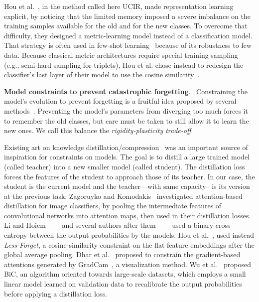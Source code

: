 \documentclass[runningheads]{llncs}
\newcommand{\parag}[1]{\vspace{0.2cm}\noindent\textbf{#1}.\ }
\begin{document}
Hou et al.~\cite{hou2019ucir}, in the method called here UCIR, made representation learning explicit, by noticing that the limited memory imposed a severe imbalance on the training samples available for the old and for the new classes. To overcome that difficulty, they designed a metric-learning model instead of a classification model. That strategy is often used in few-shot learning~\cite{gidaris2018fewshot_wo_forgetting} because of its robustness to few data. Because classical metric architectures require special training sampling (e.g., semi-hard sampling for triplets), Hou et al. chose instead to redesign the classifier's last layer of their model to use the cosine similarity~\cite{luo2018cosine_classifier}.

\parag{Model constraints to prevent catastrophic forgetting} Constraining the model's evolution to prevent forgetting is a fruitful idea proposed by several methods~\cite{kirkpatrick2017ewc,lopezpaz2017gem,aljundi2018MemoryAwareSynapses,li2018lwf,rebuffi2017icarl,castro2018end_to_end_inc_learn}. 
Preventing the model's parameters from diverging too much forces it to remember the old classes, but care must be taken to still allow it to learn the new ones. We call this balance the \textit{rigidity-plasticity trade-off}.

Existing art on knowledge distillation/compression~\cite{hinton2015knowledge_distillation} was an important source of inspiration for constraints on models. The goal is to distill a large trained model (called teacher) into a new smaller model (called student). The distillation loss forces the features of the student to approach those of its teacher. In our case, the student is the current model and the teacher---with same capacity-- is its version at the previous task. Zagoruyko and Komodakis~\cite{komodakis2017attention_residual_distillation} investigated attention-based distillation for image classifiers, by pooling the intermediate features of convolutional networks into attention maps, then used in their distillation losses.
Li and Hoiem~\cite{li2018lwf} —-\,and several authors after them~\cite{rebuffi2017icarl,castro2018end_to_end_inc_learn,wu2019bias_correction}\,—- used a binary cross-entropy between the output probabilities by the models.
Hou et al.~\cite{hou2019ucir}, used instead \textit{Less-Forget}, a cosine-similarity constraint on the flat feature embeddings after the global average pooling.
Dhar et al.~\cite{dhar2019learning_without_memorizing_gradcam} proposed to constrain the gradient-based attentions generated by GradCam~\cite{selvaraju2017gradcam}, a visualization method.
Wu et al.~\cite{wu2019bias_correction} proposed BiC, an algorithm oriented towards large-scale datasets, which employs a small linear model learned on validation data to recalibrate the output probabilities before applying a distillation loss.
\end{document}
